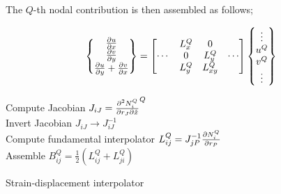 The $Q$-th nodal contribution is then assembled as follows;


\begin{equation}
\begin{Bmatrix}
\pdv{u}{x}\\
\pdv{v}{y}\\
\pdv{u}{y} + \pdv{v}{x}
\end{Bmatrix} =
\begin{bmatrix}
 &L_x^Q &0 \\
\cdots &0 &L_y^Q &\cdots\\
 &L_y^Q &L_{xy}^Q
\end{bmatrix}
\begin{Bmatrix}
\vdots\\
u^Q\\
v^Q\\
\vdots
\end{Bmatrix}
\label{eq:strain inter}
\end{equation}

\begin{algorithm}[H]
\SetAlgoLined
{}
Compute Jacobian ${J_{iJ}} = \pdv{N_i^Q}{r_J}{\hat x}^Q$\\
Invert Jacobian  ${J_{iJ}} \to J_{iJ}^{ - 1}$\\
Compute fundamental interpolator $L_{ij}^Q = J_{jP}^{ - 1}\pdv{N_i^Q}{r_P}$\\
Assemble $B_{ij}^Q = \frac{1}{2}\left( {L_{ij}^Q + L_{ji}^Q} \right)$ 
\caption{Strain-displacement interpolator}
\end{algorithm}


